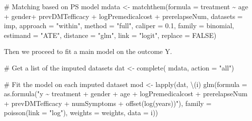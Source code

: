 \documentclass[
  letterpaper,
  DIV=11,
  numbers=noendperiod]{scrreprt}
\newenvironment{Shaded}{\begin{snugshade}}{\end{snugshade}}
\newcommand{\AttributeTok}[1]{\textcolor[rgb]{0.40,0.45,0.13}{#1}}
\newcommand{\CommentTok}[1]{\textcolor[rgb]{0.37,0.37,0.37}{#1}}
\newcommand{\ConstantTok}[1]{\textcolor[rgb]{0.56,0.35,0.01}{#1}}
\newcommand{\FloatTok}[1]{\textcolor[rgb]{0.68,0.00,0.00}{#1}}
\newcommand{\FunctionTok}[1]{\textcolor[rgb]{0.28,0.35,0.67}{#1}}
\newcommand{\NormalTok}[1]{\textcolor[rgb]{0.00,0.23,0.31}{#1}}
\newcommand{\OtherTok}[1]{\textcolor[rgb]{0.00,0.23,0.31}{#1}}
\newcommand{\SpecialCharTok}[1]{\textcolor[rgb]{0.37,0.37,0.37}{#1}}
\newcommand{\StringTok}[1]{\textcolor[rgb]{0.13,0.47,0.30}{#1}}
\begin{document}
\begin{Shaded}
\begin{Highlighting}[]
\CommentTok{\# Matching based on PS model}
\NormalTok{mdata }\OtherTok{\textless{}{-}} \FunctionTok{matchthem}\NormalTok{(}\AttributeTok{formula =}\NormalTok{ treatment }\SpecialCharTok{\textasciitilde{}}\NormalTok{ age }\SpecialCharTok{+}\NormalTok{ gender}\SpecialCharTok{+}\NormalTok{ prevDMTefficacy }\SpecialCharTok{+} 
\NormalTok{                     logPremedicalcost }\SpecialCharTok{+}\NormalTok{ prerelapseNum,}
                   \AttributeTok{datasets =}\NormalTok{ imp,}
                   \AttributeTok{approach =} \StringTok{"within"}\NormalTok{,}
                   \AttributeTok{method =} \StringTok{"full"}\NormalTok{,}
                   \AttributeTok{caliper =} \FloatTok{0.1}\NormalTok{,}
                   \AttributeTok{family =}\NormalTok{ binomial,}
                   \AttributeTok{estimand =} \StringTok{"ATE"}\NormalTok{,}
                   \AttributeTok{distance =} \StringTok{"glm"}\NormalTok{,}
                   \AttributeTok{link =} \StringTok{"logit"}\NormalTok{,}
                   \AttributeTok{replace =} \ConstantTok{FALSE}\NormalTok{) }
\end{Highlighting}
\end{Shaded}

Then we proceed to fit a main model on the outcome Y.

\begin{Shaded}
\begin{Highlighting}[]
\CommentTok{\# Get a list of the imputed datasets}
\NormalTok{dat }\OtherTok{\textless{}{-}} \FunctionTok{complete}\NormalTok{( mdata, }\AttributeTok{action =} \StringTok{"all"}\NormalTok{)}

\CommentTok{\# Fit the model on each imputed dataset}
\NormalTok{mod }\OtherTok{\textless{}{-}} \FunctionTok{lapply}\NormalTok{(dat, \textbackslash{}(i) }
                \FunctionTok{glm}\NormalTok{(}\AttributeTok{formula =} \FunctionTok{as.formula}\NormalTok{(}\StringTok{"y \textasciitilde{} treatment + gender + age + logPremedicalcost + prerelapseNum + prevDMTefficacy + numSymptoms + offset(log(years))"}\NormalTok{),}
                \AttributeTok{family =} \FunctionTok{poisson}\NormalTok{(}\AttributeTok{link =} \StringTok{"log"}\NormalTok{), }
                \AttributeTok{weights =}\NormalTok{ weights,}
                \AttributeTok{data =}\NormalTok{ i))}
\end{Highlighting}
\end{Shaded}
\end{document}
